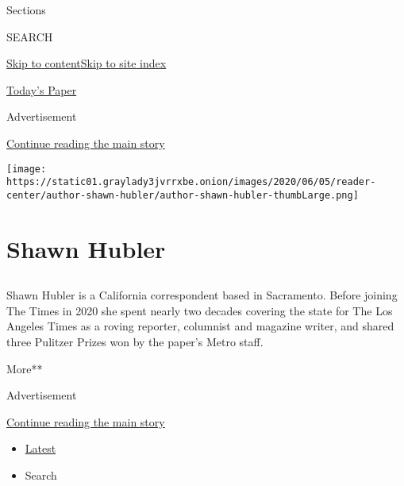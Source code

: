 Sections

SEARCH

\protect\hyperlink{site-content}{Skip to
content}\protect\hyperlink{site-index}{Skip to site index}

\href{https://myaccount.nytimes3xbfgragh.onion/auth/login?response_type=cookie\&client_id=vi}{}

\href{https://www.nytimes3xbfgragh.onion/section/todayspaper}{Today's
Paper}

Advertisement

\protect\hyperlink{after-top}{Continue reading the main story}

\texttt{[image: https://static01.graylady3jvrrxbe.onion/images/2020/06/05/reader-center/author-shawn-hubler/author-shawn-hubler-thumbLarge.png]}

\hypertarget{shawn-hubler}{%
\section{Shawn Hubler}\label{shawn-hubler}}

\hypertarget{section}{%
\subsection{}\label{section}}

Shawn Hubler is a California correspondent based in Sacramento. Before
joining The Times in 2020 she spent nearly two decades covering the
state for The Los Angeles Times as a roving reporter, columnist and
magazine writer, and shared three Pulitzer Prizes won by the paper's
Metro staff.

More**

Advertisement

\protect\hyperlink{after-mid1}{Continue reading the main story}

\begin{itemize}
\tightlist
\item
  \protect\hyperlink{stream-panel}{Latest}
\item
  Search
\end{itemize}

